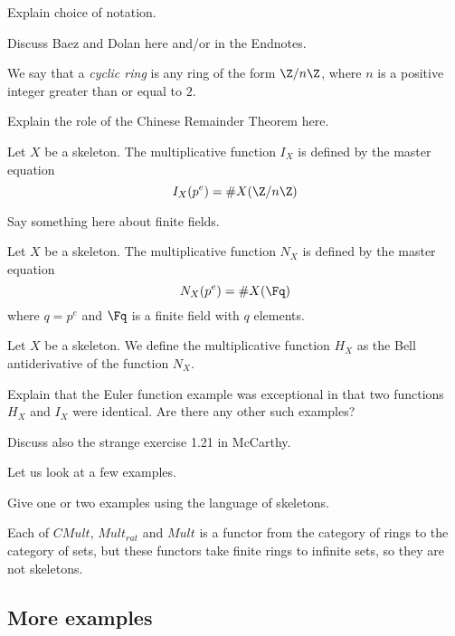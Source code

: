 Explain choice of notation.

Discuss Baez and Dolan \cite{} here and/or in the Endnotes.


\begin{definition}
We say that a \emph{cyclic ring} is any ring of the form $\Z / n \Z$, where $n$ is a positive integer greater than or equal to $2$. 
\end{definition}

Explain the role of the Chinese Remainder Theorem here.

\begin{definition}
Let $X$ be a skeleton. The multiplicative function $I_X$ is defined by the master equation
$$  I_X(p^e) = \# X( \Z / n \Z  )  $$

\end{definition}

Say something here about finite fields.

\begin{definition}
Let $X$ be a skeleton. The multiplicative function $N_X$ is defined by the master equation
$$  N_X(p^e) = \# X( \Fq )  $$
where $q= p^e$ and $\Fq$ is a finite field with $q$ elements. 
\end{definition}

\begin{definition}
Let $X$ be a skeleton. We define the multiplicative function $H_X$ as the Bell antiderivative of the function $N_X$.

\end{definition}

Explain that the Euler function example was exceptional in that two functions $H_X$ and $I_X$ were identical. Are there any other such examples? 

Discuss also the strange exercise 1.21 in McCarthy.

Let us look at a few examples.

\begin{example}
Give one or two examples using the language of skeletons.

\end{example}

\begin{remark}
Each of $CMult$, $Mult_{rat}$ and $Mult$ is a functor from the category of rings to the category of sets, but these functors take finite rings to infinite sets, so they are not skeletons.
\end{remark}


\subsection{More examples}

